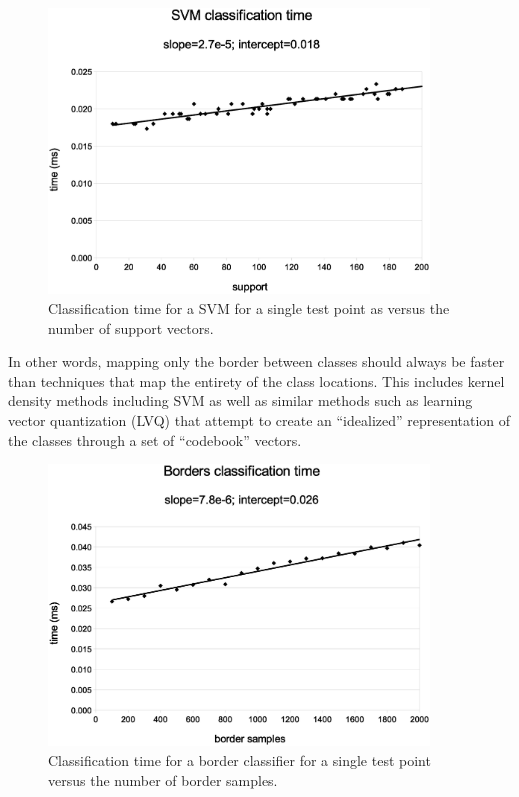 \documentclass[11pt]{article}
\begin{document}
\begin{figure}
\includegraphics[width=0.9\textwidth]{svm_time}
\caption{Classification time for a SVM for a single test point as versus the number of support vectors.}
\label{svm_time}
\end{figure}

In other words, mapping only the border between classes should always be
faster than techniques that map the entirety of the class locations.
This includes kernel density methods including SVM as well
as similar methods such as learning vector quantization (LVQ) 
\citep{Kohonen2000, LVQ_PAK}
that attempt to create an ``idealized'' representation of the classes through
a set of ``codebook'' vectors.

\begin{figure}
\includegraphics[width=0.9\textwidth]{border_time}
\caption{Classification time for a border classifier for a single test point versus the number of border samples.}
\label{border_time}
\end{figure}
\end{document}
